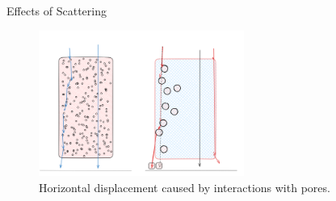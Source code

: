 \documentclass[aspectratio=169,xcolor=dvipsnames]{beamer}
\begin{document}
\begin{frame}{Effects of Scattering}
  \begin{figure}[h!]
    \centering
    \includegraphics[width=0.6\textwidth]{sidebyside.png}
    \caption{Horizontal displacement caused by interactions with pores.}
  \end{figure}

\end{frame}
\end{document}
